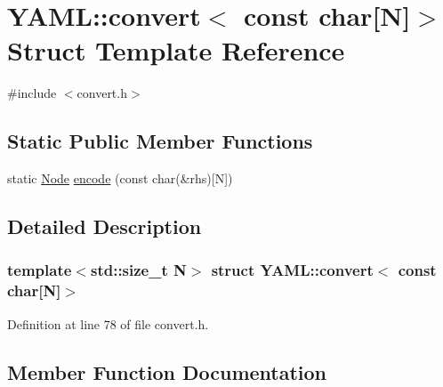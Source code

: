 \hypertarget{struct_y_a_m_l_1_1convert_3_01const_01char[_n]_4}{}\section{Y\+A\+ML\+::convert$<$ const char\mbox{[}N\mbox{]}$>$ Struct Template Reference}
\label{struct_y_a_m_l_1_1convert_3_01const_01char[_n]_4}


{\ttfamily \#include $<$convert.\+h$>$}

\subsection*{Static Public Member Functions}
\begin{DoxyCompactItemize}
\item 
static \mbox{\hyperlink{class_y_a_m_l_1_1_node}{Node}} \mbox{\hyperlink{struct_y_a_m_l_1_1convert_3_01const_01char[_n]_4_a1f4b92635b7c797a582ff31d7cf1d9ae}{encode}} (const char(\&rhs)\mbox{[}N\mbox{]})
\end{DoxyCompactItemize}


\subsection{Detailed Description}
\subsubsection*{template$<$std\+::size\+\_\+t N$>$\newline
struct Y\+A\+M\+L\+::convert$<$ const char\mbox{[}\+N\mbox{]}$>$}



Definition at line 78 of file convert.\+h.



\subsection{Member Function Documentation}
\mbox{\label{struct_y_a_m_l_1_1convert_3_01const_01char[_n]_4_a1f4b92635b7c797a582ff31d7cf1d9ae}} 
